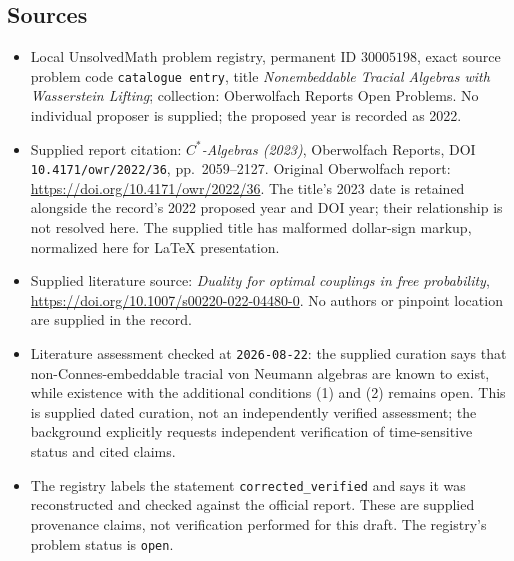\documentclass[11pt]{article}
\begin{document}
\subsection{Sources}
\begin{itemize}
\item Local UnsolvedMath problem registry, permanent ID \(30005198\), exact source problem code \texttt{catalogue entry}, title \emph{Nonembeddable Tracial Algebras with Wasserstein Lifting}; collection: Oberwolfach Reports Open Problems. No individual proposer is supplied; the proposed year is recorded as 2022.
\item Supplied report citation: \emph{\(C^*\)-Algebras (2023)}, Oberwolfach Reports, DOI \texttt{10.4171/owr/2022/36}, pp.\ 2059--2127. Original Oberwolfach report: \url{https://doi.org/10.4171/owr/2022/36}. The title's 2023 date is retained alongside the record's 2022 proposed year and DOI year; their relationship is not resolved here. The supplied title has malformed dollar-sign markup, normalized here for LaTeX presentation.
\item Supplied literature source: \emph{Duality for optimal couplings in free probability}, \url{https://doi.org/10.1007/s00220-022-04480-0}. No authors or pinpoint location are supplied in the record.
\item Literature assessment checked at \texttt{2026-08-22}: the supplied curation says that non-Connes-embeddable tracial von Neumann algebras are known to exist, while existence with the additional conditions (1) and (2) remains open. This is supplied dated curation, not an independently verified assessment; the background explicitly requests independent verification of time-sensitive status and cited claims.
\item The registry labels the statement \texttt{corrected\_verified} and says it was reconstructed and checked against the official report. These are supplied provenance claims, not verification performed for this draft. The registry's problem status is \texttt{open}.
\end{itemize}
\end{document}
